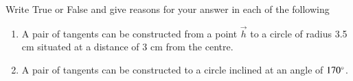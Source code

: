 Write True or False and give reasons for your answer in each of the following 
\begin{enumerate}[resume*]
\item A pair of tangents can be constructed from a point $\vec{h}$ to a circle of radius 3.5 cm situated at a distance of 3 cm from the centre.
\item A pair of tangents can be constructed to a circle inclined at an angle of $170\degree$.
\end{enumerate}
